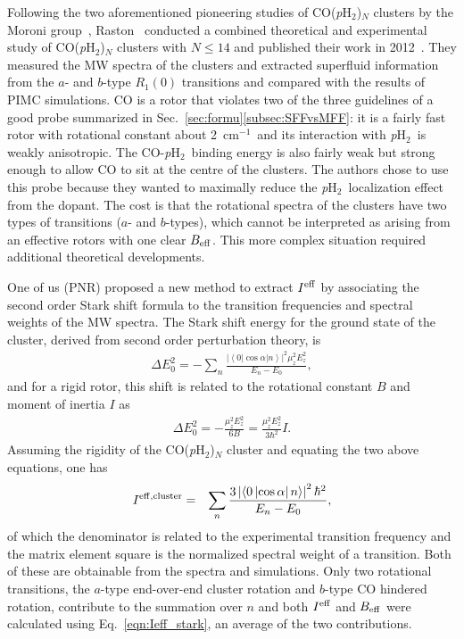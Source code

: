 \documentclass[12pt]{iopart}
\newcommand{\wno}{cm$^{-1}$}
\newcommand{\phtwo}{{\em p}H$_2$}
\begin{document}
Following the two aforementioned pioneering studies of CO(\phtwo)$_N$ clusters by the Moroni group~\cite{mroni_co_ph2_ir,moroni_pH2_melting}, Raston \etal~conducted a combined theoretical and experimental study of CO(\phtwo)$_N$ clusters with $N\le 14$ and published their work in 2012~\cite{raston_coh2_superfluid}. 
They measured the MW spectra of the clusters and extracted superfluid information from the $a$- and $b$-type $R_1\left(0 \right)$ transitions and compared with the results of PIMC simulations. 
CO is a rotor that violates two of the three guidelines of a good probe summarized in Sec.~\ref{sec:formu}\ref{subsec:SFFvsMFF}: 
it is a fairly fast rotor with rotational constant about 2~\wno~and its interaction with \phtwo~is weakly anisotropic. 
The CO-\phtwo~binding energy is also fairly weak but strong enough to allow CO to sit at the centre of the clusters. 
The authors chose to use this probe because they wanted to maximally reduce the \phtwo~localization effect from the dopant. 
The cost is that the rotational spectra of the clusters have two types of transitions ($a$- and $b$-types), 
which cannot be interpreted as arising from an effective rotors with one clear $B_{\rm eff}$.
This more complex situation required additional theoretical developments.

One of us (PNR) proposed a new method to extract $I^{\rm eff}$ by associating the second order Stark shift formula to the transition frequencies and spectral weights of the MW spectra. 
The Stark shift energy for the ground state of the cluster, derived from  second order perturbation theory, is
\begin{eqnarray}
\Delta E_0^2=-\sum_n\frac{\left| \left<0 \left|\cos \alpha \right| n\right>\right|^2\mu_z^2E_z^2}{E_n-E_0},
\end{eqnarray}
and for a rigid rotor, this shift is related to the rotational constant $B$ and moment of inertia $I$ as~\cite{zare_1988}
\begin{eqnarray}
\Delta E_0^2=-\frac{\mu_z^2E_z^2}{6B}=\frac{\mu_z^2E_z^2}{3\hbar^2}I.
\end{eqnarray}
Assuming the rigidity of the CO(\phtwo)$_N$ cluster and equating the two above equations, one has
\begin{eqnarray}
I^{\rm eff,cluster}&=&\sum_n\frac{3\left| \left<0 \left|\cos \alpha \right| n\right>\right|^2\hbar^2}{E_n-E_0}, \label{eqn:Ieff_stark}
\end{eqnarray}
of which the denominator is related to the experimental transition frequency and the matrix element square is the normalized spectral weight of a transition. 
Both of these are obtainable from the spectra and simulations. 
Only two rotational transitions, the $a$-type end-over-end cluster rotation and $b$-type CO hindered rotation, contribute to the summation over $n$ and both $I^{\rm eff}$ and $B_{\rm eff}$ were calculated using Eq.~\ref{eqn:Ieff_stark}, an average of the two contributions.
\end{document}
